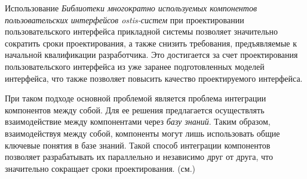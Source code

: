 Использование \textit{Библиотеки многократно используемых компонентов пользовательских интерфейсов ostis-систем} при проектировании пользовательского интерфейса прикладной системы позволяет значительно сократить сроки проектирования, а также снизить требования, предъявляемые к начальной квалификации разработчика. Это достигается за счет проектирования пользовательского интерфейса из уже заранее подготовленных моделей интерфейса, что также позволяет повысить качество проектируемого интерфейса.

При таком подходе основной проблемой является проблема интеграции компонентов между
собой. Для ее решения предлагается осуществлять взаимодействие между компонентами
через \textit{базу знаний}. Таким образом, взаимодействуя между собой, компоненты могут лишь
использовать общие ключевые понятия в базе знаний. Такой способ интеграции
компонентов позволяет разрабатывать их параллельно и независимо друг от друга, что
значительно сокращает сроки проектирования. (см.)

%